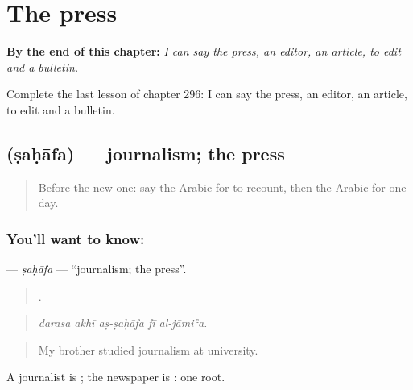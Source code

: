 
\chapter{The press}
\label{ch:ar-the-press}

\begin{chapteropening}
\textbf{By the end of this chapter:} \emph{I can say the press, an editor, an article, to edit and a bulletin.}

Complete the last lesson of chapter 296: I can say the press, an editor, an article, to edit and a bulletin.
\end{chapteropening}

\section[\texorpdfstring{\ar{صحافة} (ṣaḥāfa)}{صحافة (ṣaḥāfa)}]{ (ṣaḥāfa) — journalism; the press}

\label{lesson:AR-C296-sahafa}



\begin{quote}
Before the new one: say the Arabic for to recount, then the Arabic for one day.
\end{quote}

\subsection*{You'll want to know: }
\textbf{} — \emph{ṣaḥāfa} — \textquotedblleft{}journalism; the press\textquotedblright{}.

\begin{quote}
    .
\end{quote}

\begin{quote}
\emph{darasa akhī aṣ-ṣaḥāfa fī al-jāmiʿa.}
\end{quote}

\begin{quote}
My brother studied journalism at university.
\end{quote}

A journalist is ; the newspaper is : one root.

